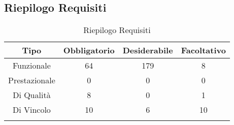 \subsection{Riepilogo Requisiti}
\normalsize
\begin{longtable}{|c|c|c|c|}
\hline 
\textbf{Tipo} & \textbf{Obbligatorio} & \textbf{Desiderabile} & \textbf{Facoltativo}\\
\hline
Funzionale & 64 & 179 & 8\\ \hline
Prestazionale & 0 & 0 & 0\\ \hline
Di Qualità & 8 & 0 & 1\\ \hline
Di Vincolo & 10 & 6 & 10\\ \hline
\caption[Riepilogo Requisiti]{Riepilogo Requisiti}
\label{tabella:riepilogorequi}
\end{longtable}
\clearpage

